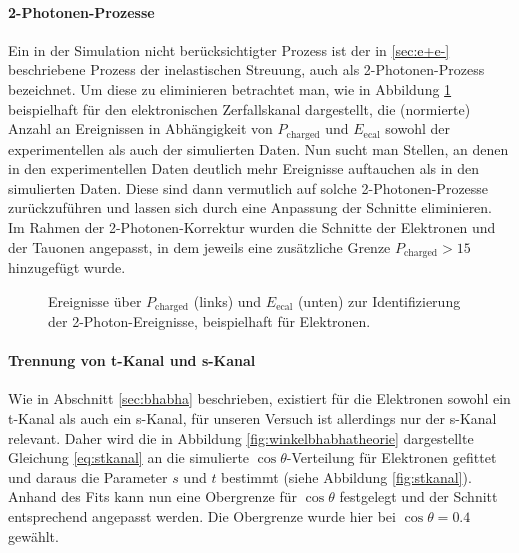 \paragraph{2-Photonen-Prozesse}
Ein in der Simulation nicht berücksichtigter Prozess ist der in \ref{sec:e+e-} beschriebene Prozess der inelastischen Streuung, auch als 2-Photonen-Prozess bezeichnet. Um diese zu eliminieren betrachtet man, wie in Abbildung \ref{fig:2photon} beispielhaft für den elektronischen Zerfallskanal dargestellt, die (normierte) Anzahl an Ereignissen in Abhängigkeit von $P_\text{charged}$ und $E_\text{ecal}$ sowohl der experimentellen als auch der simulierten Daten. Nun sucht man Stellen, an denen in den experimentellen Daten deutlich mehr Ereignisse auftauchen als in den simulierten Daten. Diese sind dann vermutlich auf solche 2-Photonen-Prozesse zurückzuführen und lassen sich durch eine Anpassung der Schnitte eliminieren. Im Rahmen der 2-Photonen-Korrektur wurden die Schnitte der Elektronen und der Tauonen angepasst, in dem jeweils eine zusätzliche Grenze $P_\text{charged}>15$ hinzugefügt wurde.
\begin{figure}
	\centering
	\caption[Identifizierung der 2-Photon-Ereignisse]{Ereignisse über $P_\text{charged}$ (links) und $E_\text{ecal}$ (unten) zur Identifizierung der 2-Photon-Ereignisse, beispielhaft für Elektronen.}
	\label{fig:2photon}
\end{figure}

\paragraph{Trennung von t-Kanal und s-Kanal}
Wie in Abschnitt \ref{sec:bhabha} beschrieben, existiert für die Elektronen sowohl ein t-Kanal als auch ein s-Kanal, für unseren Versuch ist allerdings nur der s-Kanal relevant. Daher wird die in Abbildung \ref{fig:winkelbhabhatheorie} dargestellte Gleichung \ref{eq:stkanal} an die simulierte $\cos\theta$-Verteilung für Elektronen gefittet und daraus die Parameter $s$ und $t$ bestimmt (siehe Abbildung \ref{fig:stkanal}). Anhand des Fits kann nun eine Obergrenze für $\cos\theta$ festgelegt und der Schnitt entsprechend angepasst werden. Die Obergrenze wurde hier bei $\cos\theta=0.4$ gewählt.

